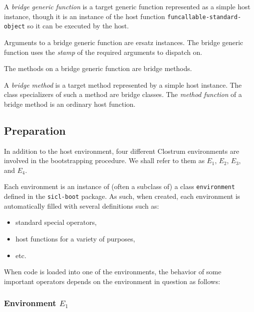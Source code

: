\begin{definition}
A \emph{bridge generic function} is a target generic function
represented as a simple host instance, though it is an instance of the
host function \texttt{funcallable-standard-object} so it can be
executed by the host.

Arguments to a bridge generic function are ersatz instances.  The
bridge generic function uses the
\emph{stamp}
 of
the required arguments to dispatch on.

The methods on a bridge generic function are bridge methods.
\end{definition}

\begin{definition}
A \emph{bridge method} is a target method represented by a simple host
instance.  The class specializers of such a method are bridge classes.
The \emph{method function} of a bridge method is an ordinary host
function.
\end{definition}

\subsection{Preparation}

In addition to the host environment, four different Clostrum
environments are involved in the bootstrapping procedure.
We shall refer to them as $E_1$, $E_2$, $E_3$, and $E_4$.

Each environment is an instance of (often a subclass of) a class
\texttt{environment} defined in the \texttt{sicl-boot} package.  As
such, when created, each environment is automatically filled with
several definitions such as:

\begin{itemize}
\item standard special operators,
\item host functions for a variety of purposes,
\item etc.
\end{itemize}

When code is loaded into one of the environments, the behavior of some
important operators depends on the environment in question as follows:

\subsubsection{Environment $E_1$}

